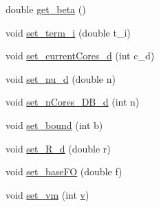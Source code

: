 \begin{DoxyCompactItemize}
\item 
double \hyperlink{classApplication_abc8a0a0b78144145d8aeefba5b3e256c}{get\-\_\-beta} ()
\item 
void \hyperlink{classApplication_a5a4a2ea2cb6d85978d9eee95d02c6689}{set\-\_\-term\-\_\-i} (double t\-\_\-i)
\item 
void \hyperlink{classApplication_a54b218ca87366e0897571416da763ba2}{set\-\_\-current\-Cores\-\_\-d} (int c\-\_\-d)
\item 
void \hyperlink{classApplication_a158448d570c0e25f7d7884af4fca0b8c}{set\-\_\-nu\-\_\-d} (double n)
\item 
void \hyperlink{classApplication_a3d116c903ecb0d92d5dc66f1210f227a}{set\-\_\-n\-Cores\-\_\-\-D\-B\-\_\-d} (int n)
\item 
void \hyperlink{classApplication_aa5bda390f99dea85e95f8d43b45c01a6}{set\-\_\-bound} (int b)
\item 
void \hyperlink{classApplication_a74d83f1191a1ab311c055da4d0d8d8d9}{set\-\_\-\-R\-\_\-d} (double r)
\item 
void \hyperlink{classApplication_a4931a778639958beec06c7efa6343602}{set\-\_\-base\-F\-O} (double f)
\item 
void \hyperlink{classApplication_a26df38cf838de9baf1ed5e5923b32124}{set\-\_\-vm} (int \hyperlink{classApplication_a57853498c230af817bc4173169847bfc}{v})
\end{DoxyCompactItemize}
